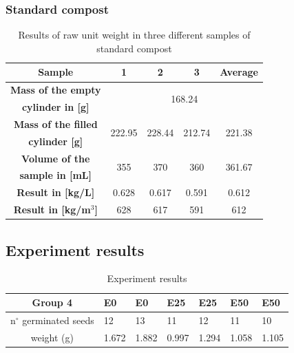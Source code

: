 \documentclass{article}
\begin{document}
\subsubsection{Standard compost}
\renewcommand{\arraystretch}{1.5}
\begin{table}[ht!]
    \centering \vspace{.3cm}
    \caption{Results of raw unit weight in three different samples of standard compost}
    \begin{tabular}{|c|c|c|c|c|}
        \hline
        \textbf{Sample} & \textbf{1} & \textbf{2} & \textbf{3} & \textbf{Average}\\
        \hline
        {\textbf{Mass of the empty}} & \multicolumn{4}{c|}{\multirow{2}{*}{168.24}}\\
        \textbf{cylinder in [g]} & \multicolumn{4}{c|}{}\\
        \hline
        \textbf{Mass of the filled} & \multirow{2}{*}{222.95} & \multirow{2}{*}{228.44} & \multirow{2}{*}{212.74} & \multirow{2}{*}{221.38}\\
        \textbf{cylinder [g]} & & & &\\
        \hline
        \textbf{Volume of the} & \multirow{2}{*}{355} & \multirow{2}{*}{370} & \multirow{2}{*}{360} & \multirow{2}{*}{361.67}\\
        \textbf{sample in [mL]} & & & &\\
        \hline
        \textbf{Result in [kg/L]} & 0.628 & 0.617 & 0.591 & 0.612\\
        \hline
        \textbf{Result in [kg/m$^3$]} & 628 & 617 & 591 & 612\\
        \hline
    \end{tabular}
\end{table}

\subsection{Experiment results}
\renewcommand{\arraystretch}{1.5}
\begin{table}[ht!]
    \centering \vspace{.3cm}
    \caption{Experiment results}
    \begin{tabular}{|c|l|l|l|l|l|l|}
        \hline
        \textbf{Group 4} & \textbf{E0} & \textbf{E0} & \textbf{E25} & \textbf{E25} & \textbf{E50} & \textbf{E50} \\
        \hline
        n$^{\circ}$ germinated seeds & 12 & 13 & 11 & 12 & 11 & 10\\
        \hline
        weight (g) & 1.672 & 1.882 & 0.997 & 1.294 & 1.058 & 1.105\\
        \hline
    \end{tabular}
\end{table}
\end{document}
